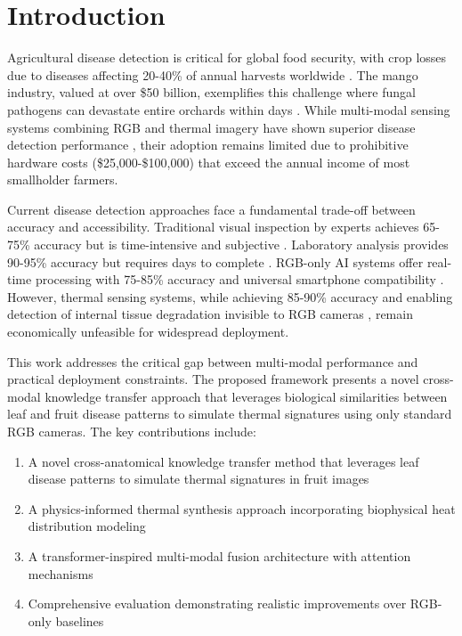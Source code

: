 \documentclass[conference]{IEEEtran}
\begin{document}
\section{Introduction}

Agricultural disease detection is critical for global food security, with crop losses due to diseases affecting 20-40\% of annual harvests worldwide \cite{fao2021}. The mango industry, valued at over \$50 billion, exemplifies this challenge where fungal pathogens can devastate entire orchards within days \cite{singh2020}. While multi-modal sensing systems combining RGB and thermal imagery have shown superior disease detection performance \cite{zhang2019}, their adoption remains limited due to prohibitive hardware costs (\$25,000-\$100,000) that exceed the annual income of most smallholder farmers.

Current disease detection approaches face a fundamental trade-off between accuracy and accessibility. Traditional visual inspection by experts achieves 65-75\% accuracy but is time-intensive and subjective \cite{wang2018}. Laboratory analysis provides 90-95\% accuracy but requires days to complete \cite{chen2019}. RGB-only AI systems offer real-time processing with 75-85\% accuracy and universal smartphone compatibility \cite{liu2020}. However, thermal sensing systems, while achieving 85-90\% accuracy and enabling detection of internal tissue degradation invisible to RGB cameras \cite{anderson2021}, remain economically unfeasible for widespread deployment.

This work addresses the critical gap between multi-modal performance and practical deployment constraints. The proposed framework presents a novel cross-modal knowledge transfer approach that leverages biological similarities between leaf and fruit disease patterns to simulate thermal signatures using only standard RGB cameras. The key contributions include:

\begin{enumerate}
    \item A novel cross-anatomical knowledge transfer method that leverages leaf disease patterns to simulate thermal signatures in fruit images
    \item A physics-informed thermal synthesis approach incorporating biophysical heat distribution modeling
    \item A transformer-inspired multi-modal fusion architecture with attention mechanisms
    \item Comprehensive evaluation demonstrating realistic improvements over RGB-only baselines
\end{enumerate}
\end{document}
